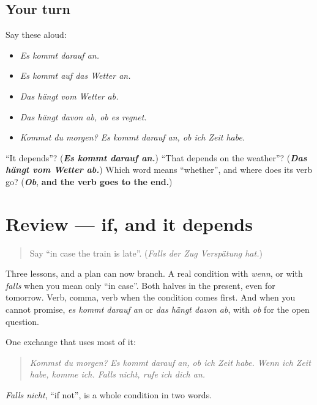 \subsection*{Your turn}
Say these aloud:

\begin{itemize}
\raggedright
  \item \emph{Es kommt darauf an.}
  \item \emph{Es kommt auf das Wetter an.}
  \item \emph{Das hängt vom Wetter ab.}
  \item \emph{Das hängt davon ab, ob es regnet.}
  \item \emph{Kommst du morgen? Es kommt darauf an, ob ich Zeit habe.}
\end{itemize}

\begin{tcolorbox}[breakable,colback=teal!4,colframe=teal!35!black,title={Before you move on}]
\textquotedblleft{}It depends\textquotedblright{}? (\emph{\textbf{Es kommt darauf an.}}) \textquotedblleft{}That depends on the weather\textquotedblright{}? (\emph{\textbf{Das hängt vom Wetter ab.}}) Which word means \textquotedblleft{}whether\textquotedblright{}, and where does its verb go? (\emph{\textbf{Ob}}, \textbf{and the verb goes to the end.})
\end{tcolorbox}
\section[(review)]{Review — if, and it depends}

\label{lesson:GE-C260-review}



\begin{quote}
Say \textquotedblleft{}in case the train is late\textquotedblright{}. (\emph{Falls der Zug Verspätung hat.})
\end{quote}

\begin{grammarlens}[title={What you've built}]
Three lessons, and a plan can now branch. A real condition with \emph{wenn}, or with \emph{falls} when you mean only \textquotedblleft{}in case\textquotedblright{}. Both halves in the present, even for tomorrow. Verb, comma, verb when the condition comes first. And when you cannot promise, \emph{es kommt darauf an} or \emph{das hängt davon ab}, with \emph{ob} for the open question.

One exchange that uses most of it:

\begin{quote}
\emph{Kommst du morgen?} \emph{Es kommt darauf an, ob ich Zeit habe. Wenn ich Zeit habe, komme ich. Falls nicht, rufe ich dich an.}
\end{quote}

\emph{Falls nicht}, \textquotedblleft{}if not\textquotedblright{}, is a whole condition in two words.
\end{grammarlens}

